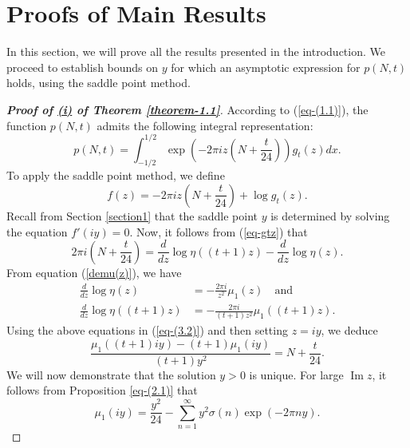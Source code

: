 \documentclass[11pt]{amsart}
\theoremstyle{plain}
\renewcommand{\Im}{\operatorname{Im}}
\numberwithin{equation}{section}
\begin{document}
		\section{Proofs of Main Results}\label{sec-proofre}
		In this section, we will prove all the results presented in the introduction. We proceed to establish bounds on $y$ for which an asymptotic expression for $p(N,t)$ holds, using the saddle point method.
		
		\begin{proof}[\textbf{\boldmath Proof of  \hyperlink{thm1.1i}{(i)} of Theorem \ref{theorem-1.1}}]
			According to (\ref{eq-(1.1)}), the function $p(N,t)$ admits the following integral representation:
			\begin{equation*}%
				p(N,t) = \int_{-1/2}^{1/2} \exp\left(-2\pi i z \left(N + \frac{t}{24}\right)\right) g_t(z) dx.
			\end{equation*}
			To apply the saddle point method, we define
			\begin{equation*}%
				f(z) = -2\pi i z\left(N+\frac{t}{24}\right) +  \log g_t(z). %
			\end{equation*}
			Recall from Section \ref{section1} that the saddle point $y$ is determined by solving the equation $f'(iy) = 0$. Now, it follows from (\ref{eq-gtz}) that
			\begin{equation}\label{eq-(3.2)}
				2\pi i\left(N + \frac{t}{24}\right) = \frac{d}{dz} \log \eta((t+1)z) - \frac{d}{dz} \log \eta(z).
			\end{equation}
			From equation (\ref{demu(z)}), we have
			\begin{align*}
				\frac{d}{dz} \log \eta(z) &= -\frac{2\pi i}{z^{2}} \mu_{1}(z)\quad\text{and}\\
				\frac{d}{dz}\log \eta((t+1)z)&=-\frac{2\pi i}{(t+1)z^{2}}\mu_{1}((t+1)z).
			\end{align*}
			Using the above equations in (\ref{eq-(3.2)}) and then setting $z = iy$, we deduce
			\begin{equation*}
				\frac{\mu_{1}((t+1)iy) - (t+1)\mu_{1}(iy)}{(t+1)y^{2}} = N + \frac{t}{24}.
			\end{equation*}
			We will now demonstrate that the solution $y>0$ is unique.
			\newline
			For large $\Im z$, it follows from Proposition \ref{eq-(2.1)} that
			\begin{equation}\label{eq-(3.3)}
				\mu_{1}(iy) = \frac{y^{2}}{24} - \sum_{n=1}^{\infty} y^{2}\sigma(n)\exp(-2\pi n y).

\end{equation}
\end{proof}
\end{document}
